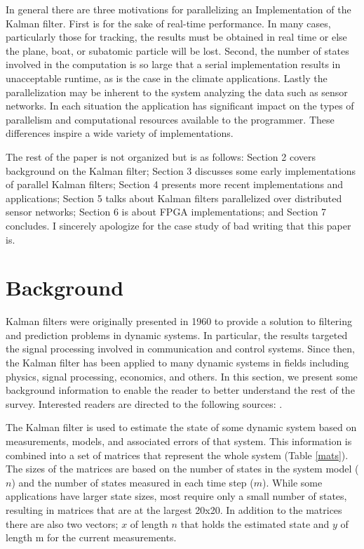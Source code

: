 \documentclass[11pt]{article}
\begin{document}
In general there are three motivations for parallelizing an Implementation of the Kalman filter. First is for the sake of real-time performance. In many cases, particularly those for tracking, the results must be obtained in real time or else the plane, boat, or subatomic particle will be lost. Second, the number of states involved in the computation is so large that a serial implementation results in unacceptable runtime, as is the case in the climate applications. Lastly the parallelization may be inherent to the system analyzing the data such as sensor networks. In each situation the application has significant impact on the types of parallelism and computational resources available to the programmer. These differences inspire a wide variety of implementations. 

The rest of the paper is not organized but is as follows: Section 2 covers background on the Kalman filter; Section 3 discusses some early implementations of parallel Kalman filters; Section 4 presents more recent implementations and applications; Section 5 talks about Kalman filters parallelized over distributed sensor networks; Section 6 is about FPGA implementations; and Section 7 concludes. I sincerely apologize for the case study of bad writing that this paper is.


\section{Background}
Kalman filters \cite{kalman1960new} were originally presented in 1960 to provide a solution to filtering and prediction problems in dynamic systems. In particular, the results targeted the signal processing involved in communication and control systems. Since then, the Kalman filter has been applied to many dynamic systems in fields including physics, signal processing, economics, and others. In this section, we present some background information to enable the reader to better understand the rest of the survey. Interested readers are directed to the following sources: \cite{blackman1986multiple, welch1995introduction, budhiraja2007survey, kalman1960new}.

The Kalman filter is used to estimate the state of some dynamic system based on measurements, models, and associated errors of that system. This information is combined into a set of matrices that represent the whole system (Table \ref{mats}). The sizes of the matrices are based on the number of states in the system model ($n$) and the number of states measured in each time step ($m$). While some applications have larger state sizes, most require only a small number of states, resulting in matrices that are at the largest 20x20. In addition to the matrices there are also two vectors; $x$ of length $n$ that holds the estimated state and $y$ of length m for the current measurements.
\end{document}
